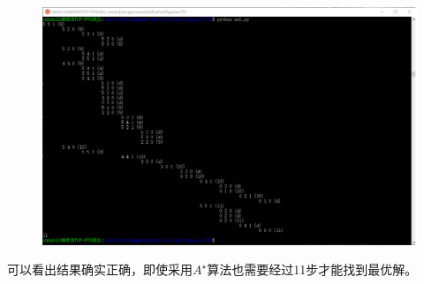\documentclass[a4paper, 11pt]{article}
\begin{document}
\begin{answer}
\begin{figure}[H]
\includegraphics[width=\linewidth]{fig/program.png}
\end{figure}
可以看出结果确实正确，即使采用$A^\star$算法也需要经过11步才能找到最优解。
\end{answer}
\begin{flushleft}
\end{flushleft}

\newpage
\end{document}
